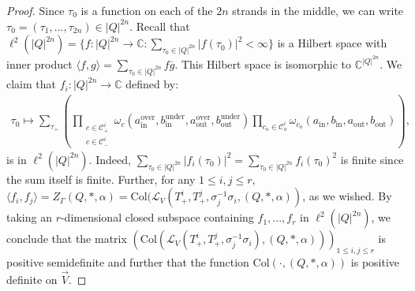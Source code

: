 \documentclass[10pt,a4paper]{amsart}
\begin{document}
\begin{proof}
    Since $\tau_0$ is a function on each of the $2n$ strands in the middle, we can write $\tau_0=(\tau_1,...,\tau_{2n})\in |Q|^{2n}$. Recall that $\ell^2(|Q|^{2n})=\{f:|Q|^{2n} \to \mathbb{C}:\sum_{\tau_0\in |Q|^{2n}} |f(\tau_0)|^2<\infty\}$ is a Hilbert space with inner product $\langle f, g\rangle =\sum_{\tau_0 \in |Q|^{2n}} f \overline{g}$. This Hilbert space is isomorphic to $\mathbb{C}^{|Q|^{2n}}$. We claim that $f_i:|Q|^{2n}\to \mathbb{C}$ defined by:
    \begin{align*}
        \tau_0 \mapsto \sum_{\tau_+}\left(\prod_{\substack{c \in \mathcal{C}_+^i\\ c\in \mathcal{C}_-^i} }\omega_{c} (a_{\text{in}}^\text{over}, b_{\text{in}}^\text{under}, a_{\text{out}}^\text{over},b_{\text{out}}^\text{under})\prod_{c_\text{o}\in \mathcal{C}_\text{o}^i}\omega_{c_\text{o}}(a_\text{in}, b_\text{in}, a_\text{out}, b_\text{out})\right),
    \end{align*}
    is in $\ell^2(|Q|^{2n})$. Indeed, $\sum_{\tau_0\in |Q|^{2n}}|f_i(\tau_0)|^2=\sum_{\tau_0\in |Q|^{2n}}f_i(\tau_0)^2$ is finite since the sum itself is finite. Further, for any $1\leq i,j \leq r$, $\langle f_i, f_j\rangle=Z_\Gamma(Q,*,\alpha)=\text{Col}(\mathscr{L}_{V}(T_+^i,T_+^j, \sigma_j^{-1}\sigma_i, (Q,*,\alpha))$, as we wished. By taking an $r$-dimensional closed subspace containing $f_1,...,f_r$ in $\ell^2(|Q|^{2n})$, we conclude that the matrix $\left(\text{Col}(\mathscr{L}_{V}(T_+^i, T_+^j, \sigma_j^{-1}\sigma_i), (Q,*,\alpha))\right)_{1\leq i,j \leq r}$ is positive semidefinite and further that the function $\text{Col}(\cdot,(Q,*,
\alpha))$ is positive definite on $\vec{V}$.
\end{proof}
\end{document}
